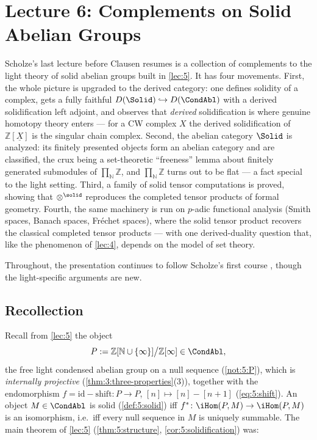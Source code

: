 \section{Lecture 6: Complements on Solid Abelian Groups}
\label{lec:6}

Scholze's last lecture before Clausen resumes is a collection of complements to
the light theory of solid abelian groups built in \cref{lec:5}. It has four
movements. First, the whole picture is upgraded to the derived category: one
defines solidity of a complex, gets a fully faithful $D(\Solid)\hookrightarrow
D(\CondAbl)$ with a derived solidification left adjoint, and observes that
\emph{derived} solidification is where genuine homotopy theory enters --- for a
CW complex $X$ the derived solidification of $\mathbb{Z}[\underline{X}]$ is the
singular chain complex. Second, the abelian category $\Solid$ is analyzed: its
finitely presented objects form an abelian category and are classified, the
crux being a set-theoretic ``freeness'' lemma about finitely generated
submodules of $\prod_{\mathbb{N}}\mathbb{Z}$, and $\prod_{\mathbb{N}}\mathbb{Z}$
turns out to be flat --- a fact special to the light setting. Third, a family of
solid tensor computations is proved, showing that $\otimes^{\solid}$ reproduces
the completed tensor products of formal geometry. Fourth, the same machinery is
run on $p$-adic functional analysis (Smith spaces, Banach spaces, Fréchet
spaces), where the solid tensor product recovers the classical completed tensor
products --- with one derived-duality question that, like the phenomenon of
\cref{lec:4}, depends on the model of set theory.

Throughout, the presentation continues to follow Scholze's first course
\cite{clausen2019condensed}, though the light-specific arguments are new.

\subsection{Recollection}

Recall from \cref{lec:5} the object
\begin{equation*}
P:=\mathbb{Z}[\mathbb{N}\cup\{\infty\}]\big/\mathbb{Z}[\infty]\in\CondAbl,
\end{equation*}
the free light condensed abelian group on a null sequence
(\cref{not:5:P}), which is \emph{internally projective}
(\cref{thm:3:three-properties}(3)), together with the endomorphism
$f=\mathrm{id}-\mathrm{shift}\colon P\to P$, $[n]\mapsto[n]-[n+1]$
(\cref{eq:5:shift}). An object $M\in\CondAbl$ is solid
(\cref{def:5:solid}) iff $f^{\ast}\colon\iHom(P,M)\to\iHom(P,M)$ is an
isomorphism, i.e.\ iff every null sequence in $M$ is uniquely summable. The main
theorem of \cref{lec:5} (\cref{thm:5:structure}, \cref{cor:5:solidification})
was:

